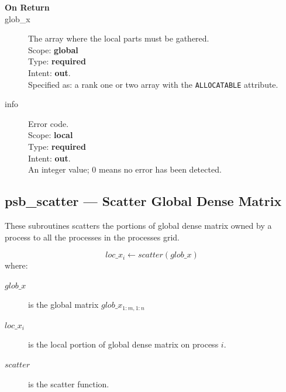 \begin{description}
\item[\bf On Return] 
\item[glob\_x] The array where the local parts must be gathered.\\
Scope: {\bf global} \\
Type: {\bf required}\\
Intent: {\bf out}.\\
Specified as: a rank one or two array with the \verb|ALLOCATABLE| attribute.
\item[info] Error code.\\
Scope: {\bf local} \\
Type: {\bf required} \\
Intent: {\bf out}.\\
An integer value; 0 means no error has been detected. 
\end{description}

%
%

\clearpage\subsection*{psb\_scatter --- Scatter Global Dense Matrix}

These subroutines scatters the portions of global dense matrix owned
by a process to all the processes in the processes grid.

\[ loc\_x_i \leftarrow scatter(glob\_x) \]
where:
\begin{description}
\item[$glob\_x$] is the global matrix $glob\_x_{1:m,1:n}$
\item[$loc\_x_i$] is the local portion of global dense matrix on
process $i$.
\item[$scatter$] is the scatter function.
\end{description}


